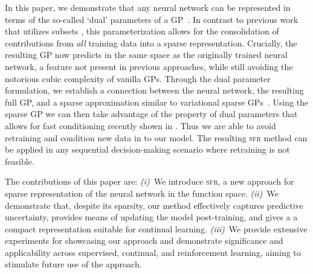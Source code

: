\documentclass{article}
\newcommand{\our}{\textsc{sfr}\xspace}
\begin{document}
In this paper, we demonstrate that any neural network can be represented in terms of the so-called `dual' parameters of a GP~\cite{csato2002sparse, adam2021dual, chang2020fast}. In contrast to previous work that utilizes subsets \cite{immer2021scalable}, this parameterization allows for the consolidation of contributions from {\em all} training data into a sparse representation. Crucially, the resulting GP now predicts in the same space as the originally trained neural network, a feature not present in previous approaches, while still avoiding the notorious cubic complexity of vanilla GPs. Through the dual parameter formulation, we establish a connection between the neural network, the resulting full GP, and a sparse approximation similar to variational sparse GPs~\cite{titsias2009variational}. Using the sparse GP we can then take advantage of the property of dual parameters that allows for fast conditioning recently shown in \cite{chang2022fantasizing}. Thus we are able to avoid retraining and condition new data in to our model. The resulting \our method can be applied in any sequential decision-making scenario where retraining is not feasible.



The contributions of this paper are:
%
{\em (i)}~We introduce \our, a new approach for sparse representation of the neural network in the function space.
{\em (ii)}~We demonstrate that, despite its sparsity, our method effectively captures predictive uncertainty, provides means of updating the model post-training, and gives a a compact representation suitable for continual learning.
{\em (iii)}~We provide extensive experiments for showcasing our approach and demonstrate significance and applicability across supervised, continual, and reinforcement learning, aiming to stimulate future use of the approach.

\end{document}
